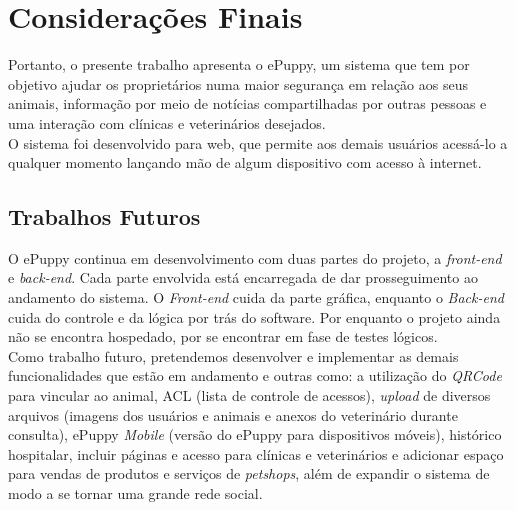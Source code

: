 \chapter{Considerações Finais}

Portanto, o presente trabalho apresenta o ePuppy, um sistema que tem por objetivo ajudar os proprietários numa maior segurança em relação aos seus animais, informação por meio de notícias compartilhadas por outras pessoas e uma interação com clínicas e veterinários desejados.
\\
\indent
O sistema foi desenvolvido para web, que permite aos demais usuários acessá-lo a qualquer momento lançando mão de algum dispositivo com acesso à internet.

\section{Trabalhos Futuros}
O ePuppy continua em desenvolvimento com duas partes do projeto, a {\it front-end} e {\it back-end}. Cada parte envolvida está encarregada de dar prosseguimento ao andamento do sistema. O {\it Front-end} cuida da parte gráfica, enquanto o {\it Back-end} cuida do controle e da lógica por trás do software. Por enquanto o projeto ainda não se encontra hospedado, por se encontrar em fase de testes lógicos.
\\
\indent
Como trabalho futuro, pretendemos desenvolver e implementar as demais funcionalidades que estão em andamento e outras como: a utilização do {\it QRCode} para vincular ao animal, ACL (lista de controle de acessos), {\it upload} de diversos arquivos (imagens dos usuários e animais e anexos do veterinário durante consulta), ePuppy {\it Mobile} (versão do ePuppy para dispositivos móveis), histórico hospitalar, incluir páginas e acesso para clínicas e veterinários e adicionar espaço para vendas de produtos e serviços de {\it petshops}, além de expandir o sistema de modo a se tornar uma grande rede social.

